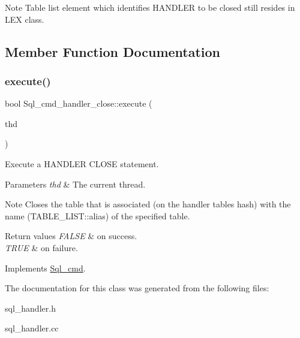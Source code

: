 \begin{DoxyNote}{Note}
Table list element which identifies H\+A\+N\+D\+L\+ER to be closed still resides in L\+EX class. 
\end{DoxyNote}


\subsection{Member Function Documentation}
\mbox{\label{classSql__cmd__handler__close_a42c36537c4cdb865a98dd73aaa50e209}} 
\subsubsection{\texorpdfstring{execute()}{execute()}}
{\footnotesize\ttfamily bool Sql\+\_\+cmd\+\_\+handler\+\_\+close\+::execute (\begin{DoxyParamCaption}\item[{T\+HD $\ast$}]{thd }\end{DoxyParamCaption})\hspace{0.3cm}{\ttfamily [virtual]}}

Execute a H\+A\+N\+D\+L\+ER C\+L\+O\+SE statement.


\begin{DoxyParams}{Parameters}
{\em thd} & The current thread.\\
\hline
\end{DoxyParams}
\begin{DoxyNote}{Note}
Closes the table that is associated (on the handler tables hash) with the name (T\+A\+B\+L\+E\+\_\+\+L\+I\+S\+T\+::alias) of the specified table.
\end{DoxyNote}

\begin{DoxyRetVals}{Return values}
{\em F\+A\+L\+SE} & on success. \\
\hline
{\em T\+R\+UE} & on failure. \\
\hline
\end{DoxyRetVals}


Implements \mbox{\hyperlink{classSql__cmd_a213367b79b551296fbb7790f2a3732fb}{Sql\+\_\+cmd}}.



The documentation for this class was generated from the following files\+:\begin{DoxyCompactItemize}
\item 
sql\+\_\+handler.\+h\item 
sql\+\_\+handler.\+cc\end{DoxyCompactItemize}
